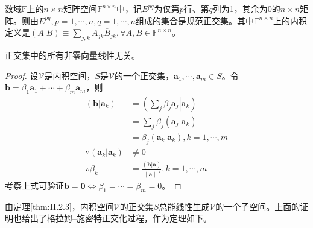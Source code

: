 \documentclass[main.tex]{subfiles}
\begin{document}
\begin{example}\label{exp:I.3.2}
数域$\mathbb{F}$上的$n\times n$矩阵空间$\mathbb{F}^{n\times n}$中，记$E^{pq}$为仅第$p$行、第$q$列为1，其余为0的$n\times n$矩阵。则由$E^{pq},p=1,\cdots,n,q=1,\cdots,n$组成的集合是规范正交集。其中$\mathbb{F}^{n\times n}$上的内积定义是$\left(A|B\right)\equiv\sum_{j,k}A_{jk}\overline{B}_{jk},\forall A, B\in\mathbb{F}^{n\times n}$。
\end{example}

\begin{theorem}\label{thm:I.2.3}
正交集中的所有非零向量线性无关。
\end{theorem}
\begin{proof}
设$\mathcal{V}$是内积空间，$S$是$\mathcal{V}$的一个正交集，$\mathbf{a}_1,\cdots,\mathbf{a}_m\in S$。令$\mathbf{b}=\beta_1\mathbf{a}_1+\cdots+\beta_m\mathbf{a}_m$，则
\begin{align*}
\left(\mathbf{b}|\mathbf{a}_k\right)&=\left(\left.\sum_j\beta_j\mathbf{a}_j\right|\left.\mathbf{a}_k\right.\right)\\
&=\sum_j\beta_j\left(\mathbf{a}_j|\mathbf{a}_k\right)\\
&=\beta_j\left(\mathbf{a}_k|\mathbf{a}_k\right),k=1,\cdots,m\\
\because \left(\mathbf{a}_k|\mathbf{a}_k\right)&\neq 0\\
\therefore \beta_k&=\frac{\left(\mathbf{b}|\mathbf{a}\right)}{\left\|\mathbf{a}\right\|^2},k=1,\cdots,m
\end{align*}
考察上式可验证$\mathbf{b}=\mathbf{0}\Leftrightarrow\beta_1=\cdots=\beta_m=0$。
\end{proof}

由定理\ref{thm:II.2.3}，内积空间$\mathcal{V}$的正交集$S$总能线性生成$\mathcal{V}$的一个子空间。上面的证明也给出了格拉姆--施密特正交化过程，作为定理如下。
\end{document}
